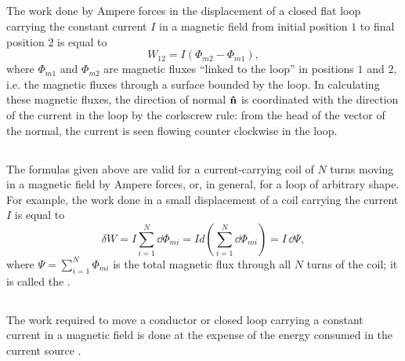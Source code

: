 \subsection{}\label{23.6.4} The work done by Ampere forces in the displacement of a closed flat loop carrying the constant current $I$ in a magnetic field from initial position $\mathit{1}$ to final position $\mathit{2}$ is equal to
\begin{equation*}%
W_{12} = I (\Phi_{m2} - \Phi_{m1}),
\end{equation*}
where $\Phi_{m1}$ and $\Phi_{m2}$ are magnetic fluxes ``linked to the loop'' in positions $\mathit{1}$ and $\mathit{2}$, i.e. the magnetic fluxes through a surface bounded by the loop. In calculating these magnetic fluxes, the direction of normal $\vu{n}$  is coordinated with the direction of the current in the loop by the corkscrew rule: from the head of the vector of the normal, the current is seen flowing counter­ clockwise in the loop.

\subsection{}\label{23.6.5} The formulas given above are valid for a current-carrying coil of $N$ turns moving in a magnetic field by Ampere forces, or, in general, for a loop of arbitrary shape. For example, the work done in a small displacement of a coil carrying the current $I$ is equal to
\begin{equation*}%
\delta W = I \sum_{i = 1}^{N} \dd \Phi_{mi} = Id \left(\sum_{i = 1}^{N} \dd \Phi_{mi} \right) = I\, \dd \Psi,
\end{equation*}
where $\Psi = \sum_{i = 1}^{N}\Phi_{mi}$ is the total magnetic flux through all $N$
turns of the coil; it is called the . 

\subsection{}\label{23.6.6} The work required to move a conductor or closed loop carrying a constant current in a magnetic field is done at the expense of the energy consumed in the current source .










